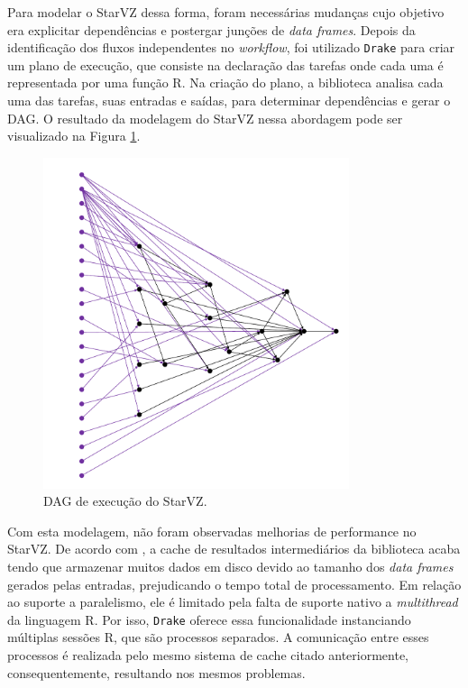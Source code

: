 Para modelar o StarVZ dessa forma, foram necessárias mudanças cujo objetivo era explicitar 
dependências e postergar junções de \emph{data frames}. Depois da identificação dos fluxos independentes    
no \emph{workflow}, foi utilizado \texttt{Drake} para criar um plano de execução, que consiste na declaração
das tarefas onde cada uma é representada por uma função R. Na criação do plano, a biblioteca analisa cada
uma das tarefas, suas entradas e saídas, para determinar dependências e gerar o DAG. O resultado da modelagem do
StarVZ nessa abordagem pode ser visualizado na Figura \ref{fig:starvz-dag}.

\begin{figure}[ht]
 \centerline{\includegraphics[width=0.8\textwidth]{./img/drake-dag-final-origin.pdf}}
 \caption{DAG de execução do StarVZ.}
 \label{fig:starvz-dag}
\end{figure}

Com esta modelagem, não foram observadas melhorias de performance no StarVZ. De acordo com \citet{ref:drakestarvz},
a cache de resultados intermediários da biblioteca acaba tendo que armazenar muitos dados em disco devido
ao tamanho dos \emph{data frames} gerados pelas entradas, prejudicando o tempo total de processamento.
Em relação ao suporte a paralelismo, ele é limitado pela falta de suporte nativo a \emph{multithread} da linguagem R.
Por isso, \texttt{Drake} oferece essa funcionalidade instanciando múltiplas sessões R, que são processos separados. A comunicação
entre esses processos é realizada pelo mesmo sistema de cache citado anteriormente, consequentemente, resultando nos mesmos
problemas.

